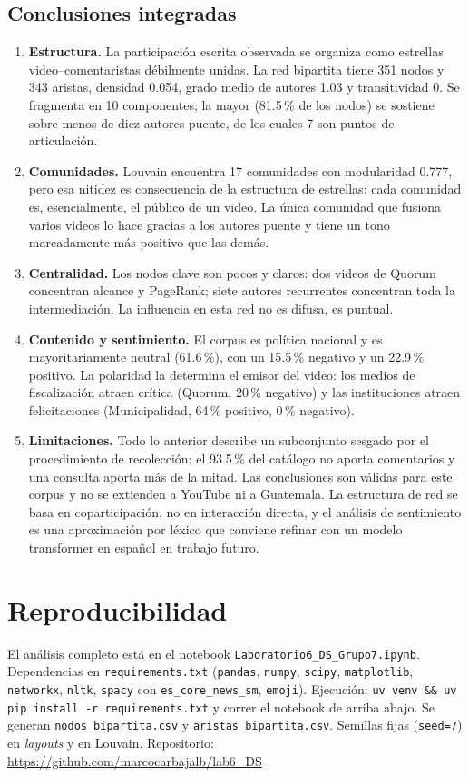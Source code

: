 \documentclass[11pt,a4paper]{article}
\begin{document}
\subsection{Conclusiones integradas}
\begin{enumerate}[leftmargin=1.6em,itemsep=3pt]
\item \textbf{Estructura.} La participaci\'on escrita observada se organiza como estrellas
video--comentaristas d\'ebilmente unidas. La red bipartita tiene 351 nodos y 343 aristas, densidad
0.054, grado medio de autores 1.03 y transitividad 0. Se fragmenta en 10 componentes; la mayor
(81.5\,\% de los nodos) se sostiene sobre menos de diez autores puente, de los cuales 7 son puntos de
articulaci\'on.
\item \textbf{Comunidades.} Louvain encuentra 17 comunidades con modularidad 0.777, pero esa nitidez
es consecuencia de la estructura de estrellas: cada comunidad es, esencialmente, el p\'ublico de un
video. La \'unica comunidad que fusiona varios videos lo hace gracias a los autores puente y tiene un
tono marcadamente m\'as positivo que las dem\'as.
\item \textbf{Centralidad.} Los nodos clave son pocos y claros: dos videos de Quorum concentran alcance
y PageRank; siete autores recurrentes concentran toda la intermediaci\'on. La influencia en esta red
no es difusa, es puntual.
\item \textbf{Contenido y sentimiento.} El corpus es pol\'itica nacional y es mayoritariamente neutral
(61.6\,\%), con un 15.5\,\% negativo y un 22.9\,\% positivo. La polaridad la determina el emisor del
video: los medios de fiscalizaci\'on atraen cr\'itica (Quorum, 20\,\% negativo) y las instituciones
atraen felicitaciones (Municipalidad, 64\,\% positivo, 0\,\% negativo).
\item \textbf{Limitaciones.} Todo lo anterior describe un subconjunto sesgado por el procedimiento de
recolecci\'on: el 93.5\,\% del cat\'alogo no aporta comentarios y una consulta aporta m\'as de la
mitad. Las conclusiones son v\'alidas para este corpus y no se extienden a YouTube ni a Guatemala.
La estructura de red se basa en coparticipaci\'on, no en interacci\'on directa, y el an\'alisis de
sentimiento es una aproximaci\'on por l\'exico que conviene refinar con un modelo transformer en
espa\~nol en trabajo futuro.
\end{enumerate}

\section*{Reproducibilidad}
El an\'alisis completo est\'a en el notebook \texttt{Laboratorio6\_DS\_Grupo7.ipynb}. Dependencias en
\texttt{requirements.txt} (\texttt{pandas}, \texttt{numpy}, \texttt{scipy}, \texttt{matplotlib},
\texttt{networkx}, \texttt{nltk}, \texttt{spacy} con \texttt{es\_core\_news\_sm}, \texttt{emoji}).
Ejecuci\'on: \texttt{uv venv \&\& uv pip install -r requirements.txt} y correr el notebook de arriba
abajo. Se generan \texttt{nodos\_bipartita.csv} y \texttt{aristas\_bipartita.csv}. Semillas fijas
(\texttt{seed=7}) en \emph{layouts} y en Louvain.
Repositorio: \url{https://github.com/marcocarbajalb/lab6_DS}
\end{document}
